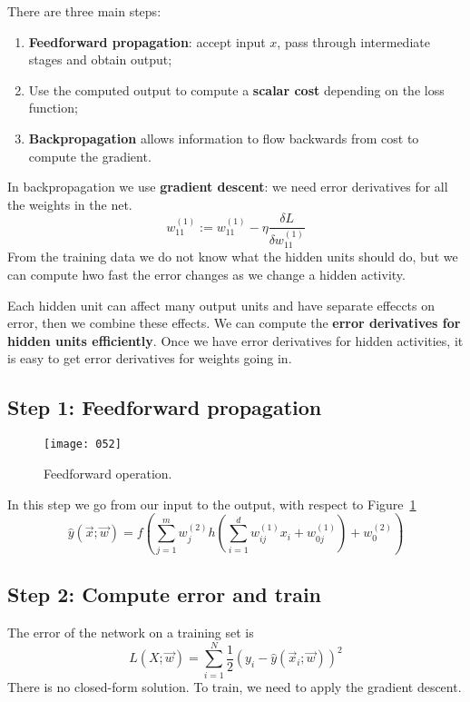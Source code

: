 There are three main steps:
\begin{enumerate}
    \item \textbf{Feedforward propagation}: accept input \(x\), pass through intermediate stages and obtain output;
    \item Use the computed output to compute a \textbf{scalar cost} depending on the loss function;
    \item \textbf{Backpropagation} allows information to flow backwards from cost to compute the gradient.
\end{enumerate}

In backpropagation we use \textbf{gradient descent}: we need error derivatives for all the weights in the net.
\begin{equation}
    w^{(1)}_{11} := w^{(1)}_{11}-\eta \frac {\delta L} {\delta w^{(1)}_{11}}
\end{equation}
From the training data we do not know what the hidden units should do, but we can compute hwo fast the error changes as we change a hidden activity.

Each hidden unit can affect many output units and have separate effeccts on error, then we combine these effects. We can compute the \textbf{error derivatives for hidden units efficiently}. Once we have error derivatives for hidden activities, it is easy to get error derivatives for weights going in.

\subsection{Step 1: Feedforward propagation}
\begin{figure}[h]
    \centering
    \texttt{[image: 052]}
    \caption{Feedforward operation.}
    \label{fig:052}
\end{figure}
In this step we go from our input to the output, with respect to Figure~\ref{fig:052}
\begin{equation}
    \hat{y} (\vec{x}; \vec{w}) = f \left( \sum_{j=1}^m w_j^{(2)} h \left( \sum_{i=1}^d w_{ij}^{(1)} x_i + w_{0j}^{(1)} \right) + w_0^{(2)} \right)
\end{equation}

\subsection{Step 2: Compute error and train}

The error of the network on a training set is
\begin{equation}
    L(X; \vec{w}) = \sum_{i=1}^N \frac 1 2 (y_i - \hat{y}(\vec{x}_i; \vec{w}))^2
\end{equation}
There is no closed-form solution. To train, we need to apply the gradient descent.

